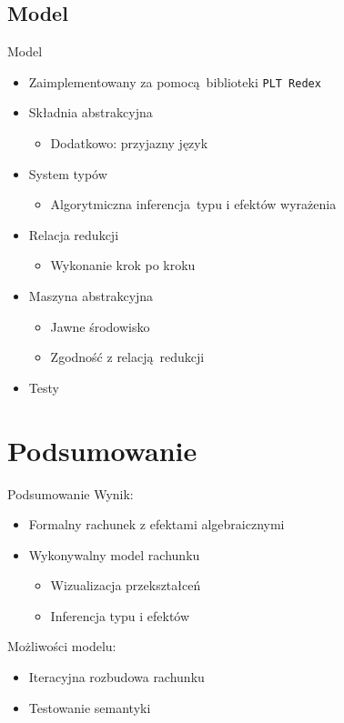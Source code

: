 \documentclass{beamer}
\newcommand{\Redex}{\texttt{PLT Redex}}
\begin{document}
\subsection{Model}
\begin{frame}{Model}
  \begin{itemize}
    \item Zaimplementowany za pomocą biblioteki \Redex
    \item Składnia abstrakcyjna
    \begin{itemize}
      \item Dodatkowo: przyjazny język
    \end{itemize}
    \item System typów
    \begin{itemize}
      \item Algorytmiczna inferencja typu i efektów wyrażenia
    \end{itemize}
    \item Relacja redukcji
    \begin{itemize}
      \item Wykonanie krok po kroku
    \end{itemize}
    \item Maszyna abstrakcyjna
    \begin{itemize}
      \item Jawne środowisko
      \item Zgodność z relacją redukcji
    \end{itemize}
    \item Testy
  \end{itemize}
\end{frame}



\section{Podsumowanie}
\begin{frame}{Podsumowanie}
  Wynik:
  \begin{itemize}
    \item Formalny rachunek z efektami algebraicznymi
    \item Wykonywalny model rachunku
    \begin{itemize}
      \item Wizualizacja przekształceń
      \item Inferencja typu i efektów
    \end{itemize}
  \end{itemize}
  \vspace{\baselineskip}
  Możliwości modelu:
  \begin{itemize}
    \item Iteracyjna rozbudowa rachunku
    \item Testowanie semantyki
  \end{itemize}
\end{frame}
\end{document}
